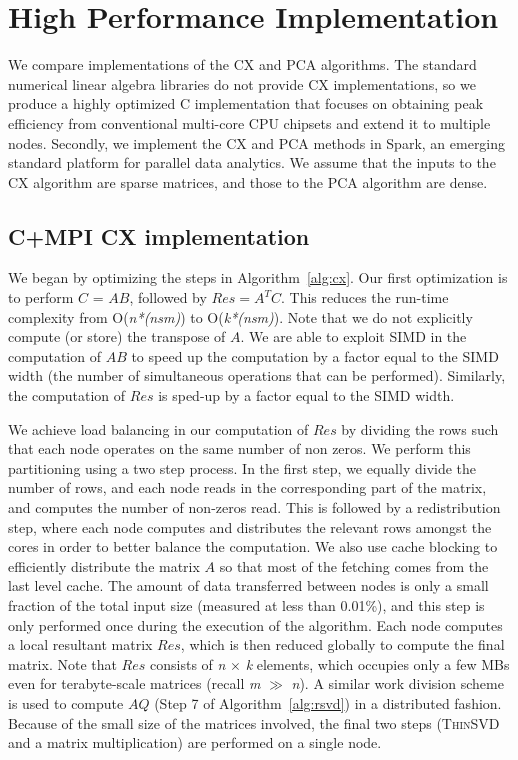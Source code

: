 
\section{High Performance Implementation}
\label{sec:implementation}

We compare implementations of the CX and PCA algorithms.  The standard
numerical linear algebra libraries do not provide CX implementations, so we
produce a highly optimized C implementation that focuses on
obtaining peak efficiency from conventional multi-core CPU chipsets and extend
it to multiple nodes.  Secondly, we implement the CX and PCA methods in Spark,
an emerging standard platform for parallel data analytics. We assume that
the inputs to the CX algorithm are sparse matrices, and those to the PCA
algorithm are dense.

\subsection {C+MPI CX implementation}
\label{sxn:single_node_opt}

We began by optimizing the steps in Algorithm~\ref{alg:cx}. Our first optimization is to perform $C$ = $AB$, 
followed by $Res = A^TC$. This reduces the run-time complexity from
O({\it{n*(nsm)}}) to O({\it{k*(nsm)}}). Note that we do not
explicitly compute (or store) the transpose of $A$. We are able to exploit SIMD in the
computation of $AB$ to speed up the computation by a factor equal to
the SIMD width (the number of simultaneous operations that can be performed).
Similarly, the computation of $Res$ is sped-up by a factor equal to the SIMD width.

We achieve load balancing in our computation of $Res$ by dividing
the rows such that each node operates on the same number of non zeros.  We
perform this partitioning using a two step process. In the first step, we
equally divide the number of rows, and each node reads in the corresponding
part of the matrix, and computes the number of non-zeros read. This is followed
by a redistribution step, where each node computes and distributes the relevant
rows amongst the cores in order to better balance the computation. We also use
cache blocking to efficiently distribute the matrix $A$ so that most of the
fetching comes from the last level cache.
The amount of data transferred between nodes is only a small fraction of the
total input size (measured at less than 0.01\%), and this step is only performed once
during the execution of the algorithm. Each node computes a local resultant
matrix $Res$, which is then reduced globally to compute the final matrix. Note
that $Res$ consists of {\it{n}} $\times$ {\it{k}} elements, which occupies only
a few MBs even for terabyte-scale matrices (recall {\it{m}} $\gg$ {\it{n}}).  A
similar work division scheme is used to compute $AQ$ (Step 7 of Algorithm~\ref{alg:rsvd}) in a distributed
fashion.  Because of the small size of the matrices involved, the final two
steps (\textsc{ThinSVD} and a matrix multiplication) are performed on a single
node.

